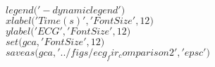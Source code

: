  \hspace*{-2.4em}{\scriptsize 152}$  legend($\color{mdarkgrey}$'-dynamiclegend'$\color{black}$)$\\
 \hspace*{-2.4em}{\scriptsize 153}$  xlabel($\color{mdarkgrey}$'Time (s)'$\color{black}$, $\color{mdarkgrey}$'FontSize'$\color{black}$, 12)$\\
 \hspace*{-2.4em}{\scriptsize 154}$  ylabel($\color{mdarkgrey}$'ECG'$\color{black}$, $\color{mdarkgrey}$'FontSize'$\color{black}$, 12)$\\
 \hspace*{-2.4em}{\scriptsize 155}$  set(gca, $\color{mdarkgrey}$'FontSize'$\color{black}$, 12)$\\
 \hspace*{-2.4em}{\scriptsize 156}$  saveas(gca, $\color{mdarkgrey}$'../figs/ecg_fir_comparison2'$\color{black}$, $\color{mdarkgrey}$'epsc'$\color{black}$)$\\ 
  
\UndefineShortVerb{\$} 
\UndefineShortVerb{\#}